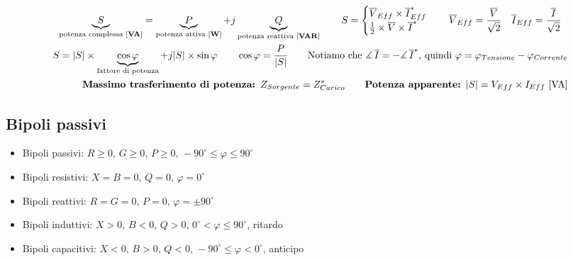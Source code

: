 \documentclass[10pt]{article}
\renewcommand{\deg}{^{\circ}}
\newcommand{\unit}[1]{\left[\mathbf{#1}\right]}
\begin{document}
        \begin{gather*}
            \underbrace{S}_{\text{potenza complessa } \unit{VA}} = \underbrace{P}_{\text{potenza attiva } \unit{W}} + j \underbrace{Q}_{\text{potenza reattiva } \unit{VAR}} \qquad
                S =
                    \begin{cases}
                        \overline{V}_{Eff} \times \overline{I}^*_{Eff}\\
                        \frac{1}{2} \times \overline{V} \times \overline{I}^*
                    \end{cases}
                \quad \overline{V}_{Eff} = \frac{\overline{V}}{\sqrt{2}} \quad \overline{I}_{Eff} = \frac{\overline{I}}{\sqrt{2}}\\
                S = \abs{S} \times \underbrace{\cos \varphi}_{\text{fattore di potenza}} + j \abs{S} \times \sin \varphi \qquad \cos \varphi = \frac{P}{\abs{S}} \qquad \text{Notiamo che } \measuredangle \, \overline{I} = - \measuredangle \, \overline{I}^* \text{, quindi } \varphi = \varphi_{Tensione} - \varphi_{Corrente}\\
                \qquad\quad\textbf{Massimo trasferimento di potenza: } Z_{Sorgente} = Z^*_{Carico} \qquad \textbf{Potenza apparente: } \abs{S} = V_{Eff} \times I_{Eff} \text{ [VA]}
            \end{gather*}

    \vspace{-2\baselineskip}
    \subsection*{Bipoli passivi}
    \vspace{-.5\baselineskip}

        \begin{minipage}[t]{.45\textwidth}
            \begin{itemize}
                \item Bipoli passivi: \(R \geqslant 0,\, G \geqslant 0,\, P \geqslant 0,\, -90\deg \leqslant \varphi \leqslant 90\deg\)
                \item Bipoli resistivi: \(X=B=0,\, Q=0,\, \varphi=0\deg\)
                \item Bipoli reattivi: \(R=G=0,\, P=0,\, \varphi=\pm90\deg\)
            \end{itemize}
        \end{minipage}
        \hfill
        \begin{minipage}[t]{.55\textwidth}
            \begin{itemize}
                \item Bipoli induttivi: \(X > 0,\, B<0,\, Q>0,\, 0\deg < \varphi \leqslant 90\deg\), ritardo
                \item Bipoli capacitivi: \(X<0,\, B>0,\, Q<0,\, -90\deg \leqslant \varphi < 0\deg\), anticipo
            \end{itemize}
        \end{minipage}
\end{document}
